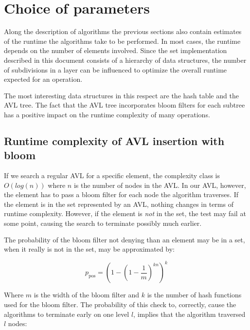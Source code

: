 \section{Choice of parameters}
\label{sec:parameters}

    Along the description of algorithms the previous sections also contain
    estimates of the runtime the algorithms take to be performed.
    In most cases, the runtime depends on the number of elements involved.
    Since the set implementation described in this document consists of
    a hierarchy of data structures, the number of subdivisions in a layer
    can be influenced to optimize the overall runtime expected for an
    operation.

    The most interesting data structures in this respect are the hash table
    and the AVL tree.
    The fact that the AVL tree incorporates bloom filters for each subtree has
    a positive impact on the runtime complexity of many operations.

    \subsection{Runtime complexity of AVL insertion with bloom}
    \label{sec:parameters-AVL_insert_bloom}

        If we search a regular AVL for a specific element, the complexity class
        is $O(log(n))$ where $n$ is the number of nodes in the AVL.
        In our AVL, however, the element has to pass a bloom filter for each
        node the algorithm traverses.
        If the element is in the set represented by an AVL, nothing changes in
        terms of runtime complexity.
        However, if the element is \emph{not} in the set, the test may fail at
        some point, causing the search to terminate possibly much earlier.

        The probability of the bloom filter not denying than an element may be
        in a set, when it really is not in the set, may be approximated by:

        \begin{equation}
            p_\mathrm{pos} =
            \left(1 - \left(1 - \frac{1}{m}\right)^{kn}\right)^k
            \label{eq:parameters-AVL_bloom-false_pos}
        \end{equation}

        Where $m$ is the width of the bloom filter and $k$ is the number of hash
        functions used for the bloom filter.
        The probability of this check to, correctly, cause the algorithms to
        terminate early on one level $l$, implies that the algorithm traversed
        $l$ nodes:

